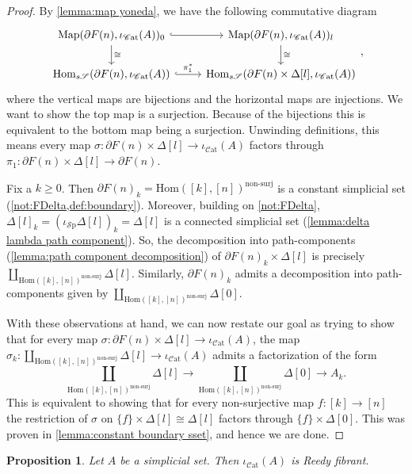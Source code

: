 \documentclass[11pt, a4paper]{amsart}
\newcommand{\Hom}{\mathrm{Hom}}
\newcommand{\Map}{\mathrm{Map}}
\newcommand{\sSp}{s\mathscr{S}}
\newcommand{\Cat}{\mathscr{C}\mathrm{at}}
\newcommand{\inccat}{\iota_{\Cat}}
\newcommand{\incspace}{\iota_{\mathscr{S}\mathrm{p}}}
\newtheorem{proposition}[equation]{Proposition}
\theoremstyle{definition}
\theoremstyle{remark}
\numberwithin{equation}{section}
\begin{document}
\begin{proof}
  By \cref{lemma:map yoneda}, we have the following commutative diagram
  \[
  \begin{tikzcd}
    \Map(\partial F(n), \inccat(A))_0 \arrow[r, hookrightarrow] \arrow[d, "\cong"] & \Map(\partial F(n), \inccat(A))_l \arrow[d, "\cong"] \\
    \Hom_{\sSp}(\partial F(n), \inccat(A)) \arrow[r, hookrightarrow, "\pi_1^*"] & \Hom_{\sSp}(\partial F(n) \times \Delta[l]  , \inccat(A))
  \end{tikzcd},
  \]
  where the vertical maps are bijections and the horizontal maps are injections. We want to show the top map is a surjection. Because of the bijections this is equivalent to the bottom map being a surjection. Unwinding definitions, this means every map $\sigma\colon \partial F(n) \times \Delta[l] \to \inccat(A)$ factors through $\pi_1\colon \partial F(n) \times \Delta[l] \to \partial F(n)$.

  Fix a $k \geq 0$. Then $\partial F(n)_k = \Hom([k],[n])^{\text{non-surj}}$ is a constant simplicial set (\cref{not:FDelta,def:boundary}). Moreover, building on \cref{not:FDelta}, $\Delta[l]_k = (\incspace \Delta[l])_k = \Delta[l]$ is a connected simplicial set (\cref{lemma:delta lambda path component}). So, the decomposition into path-components (\cref{lemma:path component decomposition}) of $\partial F(n)_k \times \Delta[l]$ is precisely $\coprod_{\Hom([k],[n])^{\text{non-surj}}} \Delta[l]$. Similarly, $\partial F(n)_k$ admits a decomposition into path-components given by $\coprod_{\Hom([k],[n])^{\text{non-surj}}} \Delta[0]$.

  With these observations at hand, we can now restate our goal as trying to show that for every map $\sigma\colon \partial F(n) \times \Delta[l] \to \inccat(A)$, the map $\sigma_k \colon \coprod_{\Hom([k],[n])^{\text{non-surj}}} \Delta[l] \to \inccat(A)$ admits a factorization of the form
  \[\coprod_{\Hom([k],[n])^{\text{non-surj}}} \Delta[l] \to \coprod_{\Hom([k],[n])^{\text{non-surj}}} \Delta[0] \to A_k.\]
  This is equivalent to showing that for every non-surjective map $f\colon [k] \to [n]$ the restriction of $\sigma$ on $\{f\} \times \Delta[l] \cong \Delta[l]$ factors through $\{f\} \times \Delta[0]$. This was proven in \cref{lemma:constant boundary sset}, and hence we are done.
\end{proof}


\begin{proposition} \label{prop:inccat reedy fibrant}
  Let $A$ be a simplicial set. Then $\inccat(A)$ is Reedy fibrant.
\end{proposition}
\end{document}
